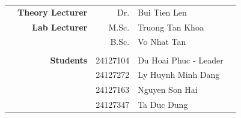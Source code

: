 \begin{titlepage}
\begin{center}
        \begin{table}[H]
            \begin{center}
                \begin{tabular}{rrrlc}
                     & \large{\textbf{Theory Lecturer}} & \large{Dr.} & \large{Bui Tien Len}        &                  \\
                     & \large{\textbf{Lab Lecturer}}    & \large{M.Sc.} &\large{Truong Tan Khoa} &                  \\
                     &                                  & \large{B.Sc.} & \large{Vo Nhat Tan} &                  \\
                     &                                  &                              &                  \\
                     & \large{\textbf{Students}}        & \large{24127104} & \large{Du Hoai Phuc - Leader}          \\
                     &                                  & \large{24127272} & \large{Ly Huynh Minh Dang}\\
                     &                                  & \large{24127163} & \large{Nguyen Son Hai}\\
                     &                                  & \large{24127347} & \large{Ta Duc Dung}
                \end{tabular}
            \end{center}
        \end{table}
    \end{center}
	\vspace{3cm}
\end{titlepage}